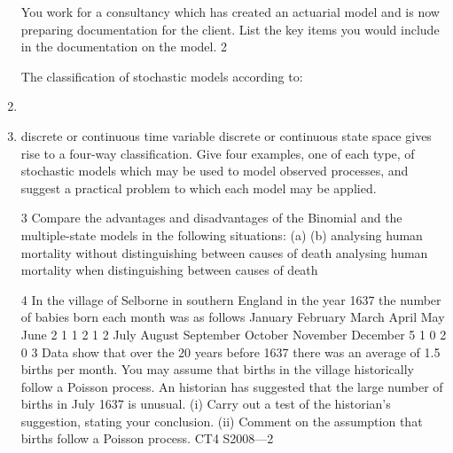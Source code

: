 \documentclass[a4paper,12pt]{article}
\begin{document}
\begin{enumerate}
You work for a consultancy which has created an actuarial model and is now
preparing documentation for the client.
List the key items you would include in the documentation on the model.
2

The classification of stochastic models according to:
\item
\item
discrete or continuous time variable
discrete or continuous state space
gives rise to a four-way classification.
Give four examples, one of each type, of stochastic models which may be used to
model observed processes, and suggest a practical problem to which each model may
be applied.

3
Compare the advantages and disadvantages of the Binomial and the multiple-state
models in the following situations:
(a)
(b)
analysing human mortality without distinguishing between causes of death
analysing human mortality when distinguishing between causes of death

4
In the village of Selborne in southern England in the year 1637 the number of babies
born each month was as follows
January
February
March
April
May
June
2
1
1
2
1
2
July
August
September
October
November
December
5
1
0
2
0
3
Data show that over the 20 years before 1637 there was an average of 1.5 births per
month. You may assume that births in the village historically follow a Poisson
process.
An historian has suggested that the large number of births in July 1637 is unusual.
(i) Carry out a test of the historian’s suggestion, stating your conclusion.
(ii) Comment on the assumption that births follow a Poisson process.
CT4 S2008—2


\end{enumerate}
\end{document}
